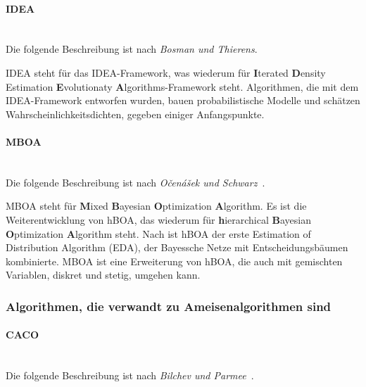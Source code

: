 \documentclass[fontsize=12, a4aper]{scrartcl}
\begin{document}
	\paragraph{IDEA}\mbox{}\\
	
	Die folgende Beschreibung ist nach \textit{Bosman und Thierens}\cite{bosman2000continuous}.\hfill\newline
	
	IDEA steht für das IDEA-Framework, was wiederum für \textbf{I}terated \textbf{D}ensity Estimation \textbf{E}volutionaty \textbf{A}lgorithms-Framework steht. Algorithmen, die mit dem IDEA-Framework entworfen wurden, bauen probabilistische Modelle und schätzen Wahrscheinlichkeitsdichten, gegeben einiger Anfangspunkte.
	
	\paragraph{MBOA}\mbox{}\\
	
	Die folgende Beschreibung ist nach \textit{Očenášek und Schwarz}~\cite{ocenavsek2002estimation}.\hfill\newline
	
	MBOA steht für \textbf{M}ixed \textbf{B}ayesian \textbf{O}ptimization \textbf{A}lgorithm. Es ist die Weiterentwicklung von hBOA, das wiederum für \textbf{h}ierarchical \textbf{B}ayesian \textbf{O}ptimization \textbf{A}lgorithm steht. Nach \cite{pelikan2001bayesian} ist hBOA der erste Estimation of Distribution Algorithm (EDA), der Bayessche Netze mit Entscheidungsbäumen kombinierte. MBOA ist eine Erweiterung von hBOA, die auch mit gemischten Variablen, diskret und stetig, umgehen kann.
	
	\subsubsection{Algorithmen, die verwandt zu Ameisenalgorithmen sind} \label{subsubsec:Grundlagen:Vergleichsalgorithmen:Alg_verwandt_Ameisenalg}
	
	\paragraph{CACO}\mbox{}\\
	
	Die folgende Beschreibung ist nach \textit{Bilchev und Parmee}~\cite{bilchev1995ant}.\hfill\newline
	
\end{document}
